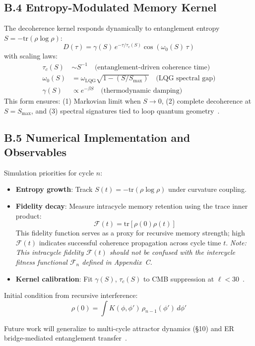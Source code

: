\subsection*{B.4 Entropy-Modulated Memory Kernel}

The decoherence kernel responds dynamically to entanglement entropy \( S = -\mathrm{tr}(\rho \log \rho) \):
\[
D(\tau) = \gamma(S) \, e^{-\tau/\tau_c(S)} \cos(\omega_0(S) \, \tau)
\]
with scaling laws:
\begin{align*}
    \tau_c(S) &\sim S^{-1} \quad \text{(entanglement-driven coherence time)} \\
    \omega_0(S) &= \omega_{\text{LQG}} \sqrt{1 - \left(S/S_{\text{max}}\right)} \quad \text{(LQG spectral gap)} \\
    \gamma(S) &\propto e^{-\beta S} \quad \text{(thermodynamic damping)}
\end{align*}
This form ensures: (1) Markovian limit when \( S \to 0 \), (2) complete decoherence at \( S = S_{\text{max}} \), and (3) spectral signatures tied to loop quantum geometry~\cite{breuer2002theory}.

\subsection*{B.5 Numerical Implementation and Observables}

Simulation priorities for cycle \( n \):
\begin{itemize}
    \item \textbf{Entropy growth}: Track \( S(t) = -\mathrm{tr}(\rho \log \rho) \) under curvature coupling.
    \item \textbf{Fidelity decay}: Measure intracycle memory retention using the trace inner product:
    \[
    \mathcal{F}(t) = \mathrm{tr}[\rho(0)\rho(t)]
    \]
    This fidelity function serves as a proxy for recursive memory strength; high \( \mathcal{F}(t) \) indicates successful coherence propagation across cycle time \( t \). \textit{Note: This intracycle fidelity \( \mathcal{F}(t) \) should not be confused with the intercycle fitness functional \( \mathcal{F}_n \) defined in Appendix~C.}
    \item \textbf{Kernel calibration}: Fit \( \gamma(S) \), \( \tau_c(S) \) to CMB suppression at \( \ell < 30 \)~\cite{planck2019inflation}.
\end{itemize}

Initial condition from recursive interference:
\[
\rho(0) = \int K(\phi, \phi') \, \rho_{n-1}(\phi') \, d\phi'
\]

Future work will generalize to multi-cycle attractor dynamics (§10) and ER bridge-mediated entanglement transfer~\cite{almheiri2019entropy}.
